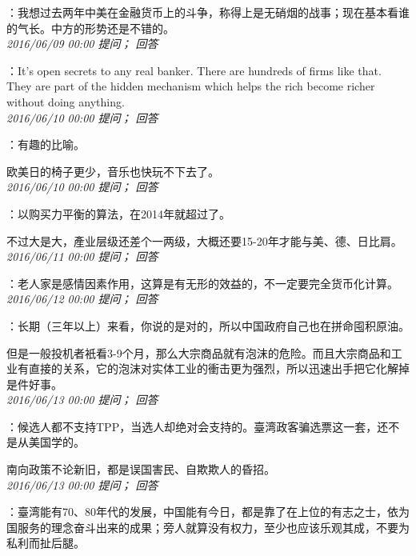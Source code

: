 \documentclass[twocolumn]{ctexart}
\begin{document}
：我想过去两年中美在金融货币上的斗争，称得上是无硝烟的战事；现在基本看谁的气长。中方的形势还是不错的。\\

\textit{\hfill\noindent\small 2016/06/09 00:00 提问； 回答}

：It's open secrets to any real banker. There are hundreds of firms like that. They are part of the hidden mechanism which helps the rich become richer without doing anything.\\

\textit{\hfill\noindent\small 2016/06/10 00:00 提问； 回答}

：有趣的比喻。

欧美日的椅子更少，音乐也快玩不下去了。\\

\textit{\hfill\noindent\small 2016/06/10 00:00 提问； 回答}

：以购买力平衡的算法，在2014年就超过了。

不过大是大，產业层级还差个一两级，大概还要15-20年才能与美、德、日比肩。\\

\textit{\hfill\noindent\small 2016/06/11 00:00 提问； 回答}

：老人家是感情因素作用，这算是有无形的效益的，不一定要完全货币化计算。\\

\textit{\hfill\noindent\small 2016/06/12 00:00 提问； 回答}

：长期（三年以上）来看，你说的是对的，所以中国政府自己也在拼命囤积原油。

但是一般投机者衹看3-9个月，那么大宗商品就有泡沫的危险。而且大宗商品和工业有直接的关系，它的泡沫对实体工业的衝击更为强烈，所以迅速出手把它化解掉是件好事。\\

\textit{\hfill\noindent\small 2016/06/13 00:00 提问； 回答}

：候选人都不支持TPP，当选人却绝对会支持的。臺湾政客骗选票这一套，还不是从美国学的。

南向政策不论新旧，都是误国害民、自欺欺人的昏招。\\

\textit{\hfill\noindent\small 2016/06/13 00:00 提问； 回答}

：臺湾能有70、80年代的发展，中国能有今日，都是靠了在上位的有志之士，依为国服务的理念奋斗出来的成果；旁人就算没有权力，至少也应该乐观其成，不要为私利而扯后腿。\\
\end{document}
